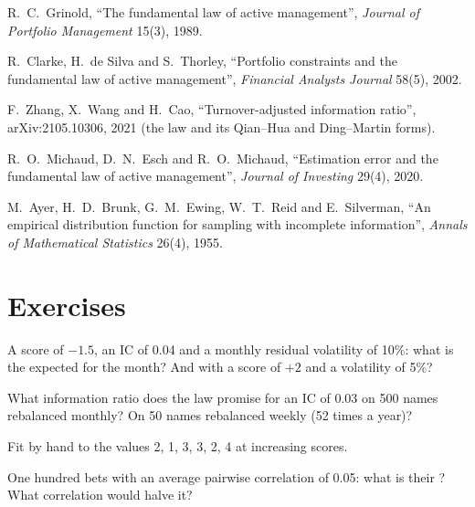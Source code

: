 \begin{omsources}
\item R.~C.~Grinold, ``The fundamental law of active management'', \emph{Journal of Portfolio Management} 15(3), 1989.
\item R.~Clarke, H.~de Silva and S.~Thorley, ``Portfolio constraints and the fundamental law of active management'', \emph{Financial Analysts Journal}
58(5), 2002.
\item F.~Zhang, X.~Wang and H.~Cao, ``Turnover-adjusted information ratio'', arXiv:2105.10306, 2021 (the law and its Qian--Hua and Ding--Martin forms).
\item R.~O.~Michaud, D.~N.~Esch and R.~O.~Michaud, ``Estimation error and the fundamental law of active management'', \emph{Journal of Investing}
29(4), 2020.
\item M.~Ayer, H.~D.~Brunk, G.~M.~Ewing, W.~T.~Reid and E.~Silverman, ``An empirical distribution function for sampling with incomplete information'',
\emph{Annals of Mathematical Statistics} 26(4), 1955.
\end{omsources}

\section{Exercises}

\begin{exercise}[$\star$]\label{exo:rs:from-signal-to-forecast:1}
A score of $-1.5$, an IC of 0.04 and a monthly residual volatility of 10\%: what is the expected  for the month? And with a score of
$+2$ and a volatility of 5\%?
\end{exercise}

\begin{exercise}[$\star$]\label{exo:rs:from-signal-to-forecast:2}
What information ratio does the law promise for an IC of 0.03 on 500 names rebalanced monthly? On 50 names rebalanced weekly (52 times a year)?
\end{exercise}

\begin{exercise}[$\star$]\label{exo:rs:from-signal-to-forecast:3}
Fit  by hand to the values 2, 1, 3, 3, 2, 4 at increasing scores.
\end{exercise}

\begin{exercise}[$\star\star$]\label{exo:rs:from-signal-to-forecast:4}
One hundred bets with an average pairwise correlation of 0.05: what is their ? What correlation would halve it?
\end{exercise}

